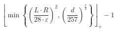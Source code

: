 \[\left\lfloor \min\left\{ \left(\frac{L \cdot R}{28 \cdot \varepsilon}\right)^{2}, \left(\frac{d}{257}\right)^{\frac{1}{3}} \right\} \right\rfloor_{+} - 1\]
